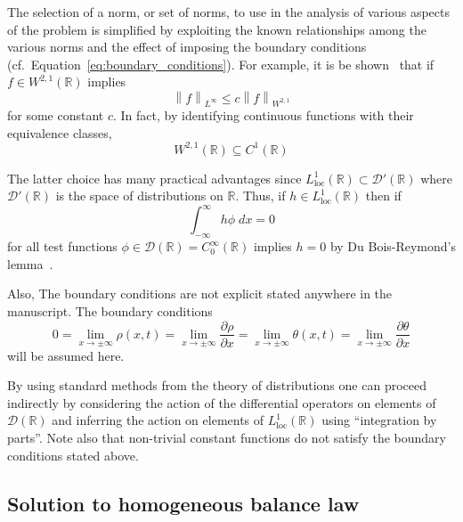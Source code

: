 \documentclass[12pt]{amsart}
\begin{document}
The selection of a norm, or set of norms, to use in the analysis of
various aspects of the problem is simplified by exploiting the known
relationships among the various norms and the effect of imposing the
boundary conditions (cf.\ Equation~\ref{eq:boundary_conditions}).  For
example, it is be shown~\cite[Theorem 8.1.1]{Strichartz:2003} that
if $f\in W^{2,1}(\mathbb{R})$ implies
\begin{equation}
  \left\|f\right\|_{L^{\infty}} \le c \left\|f\right\|_{W^{2,1}}
\end{equation}
for some constant $c$.  In fact, by identifying continuous functions
with their equivalence classes,
\begin{equation}
  W^{2,1}(\mathbb{R}) \subseteq C^{1}(\mathbb{R})
\end{equation}


The latter choice has many practical advantages since
$L^{1}_{\text{loc}}(\mathbb{R}) \subset \mathcal{D}'(\mathbb{R})$
where $\mathcal{D}'(\mathbb{R})$ is the space of distributions on
$\mathbb{R}$.  Thus, if $h\in L^{1}_{\text{loc}}(\mathbb{R})$ then if
\begin{equation}
  \int_{-\infty}^{\infty} h\phi \; dx = 0
\end{equation}
for all test functions $\phi\in \mathcal{D}(\mathbb{R}) =
C^{\infty}_{0}(\mathbb{R})$ implies $h=0$ by Du Bois-Reymond's
lemma~\cite{Grubb:2009}.

Also, The boundary conditions are not explicit stated anywhere in the
manuscript.  The boundary conditions
\begin{equation}
  0 = 
  \lim_{x\rightarrow \pm\infty} \rho(x, t) =
  \lim_{x\rightarrow \pm\infty} \frac{\partial\rho}{\partial x} =  
  \lim_{x\rightarrow \pm\infty} \theta(x, t)  =  
  \lim_{x\rightarrow \pm\infty} \frac{\partial \theta}{\partial x}
\end{equation}
will be assumed here.  




By using standard methods from the theory of distributions one can
proceed indirectly by considering the action of the differential
operators on elements of $\mathcal{D}(\mathbb{R})$ and inferring the
action on elements of $L^{1}_{\text{loc}}(\mathbb{R})$ using
``integration by parts''.  Note also that non-trivial constant
functions do not satisfy the boundary conditions stated above.



\subsection{Solution to homogeneous balance law}
\end{document}
